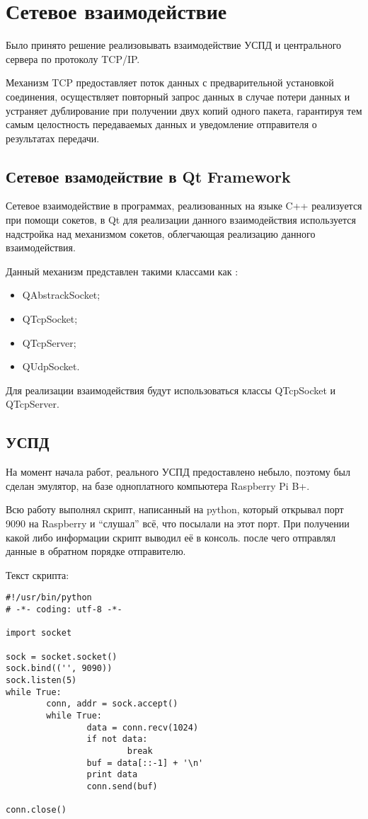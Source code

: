 \section{Сетевое взаимодействие}

Было принято решение реализовывать взаимодействие УСПД и центрального сервера по протоколу TCP/IP.

Механизм TCP предоставляет поток данных с предварительной установкой соединения, осуществляет повторный запрос данных в случае потери данных и устраняет дублирование при получении двух копий одного пакета, гарантируя тем самым целостность передаваемых данных и уведомление отправителя о результатах передачи.

\subsection{Сетевое взамодействие в Qt Framework}

Сетевое взаимодействие в программах, реализованных на языке C++ реализуется при помощи сокетов, в Qt для реализации данного взаимодействия используется надстройка над механизмом сокетов, облегчающая реализацию данного взаимодействия.

Данный механизм представлен такими классами как \cite{qt_net}:
\begin{itemize}
 \item QAbstrackSocket;
 \item QTcpSocket;
 \item QTcpServer;
 \item QUdpSocket.
\end{itemize}

Для реализации взаимодействия будут использоваться классы QTcpSocket и QTcpServer.

\subsection{УСПД}

На момент начала работ, реального УСПД предоставлено небыло, поэтому был сделан эмулятор, на базе одноплатного компьютера Raspberry Pi B+. 

Всю работу выполнял скрипт, написанный на python, который открывал порт 9090 на Raspberry и ``слушал'' всё, что посылали на этот порт. При получении какой либо информации скрипт выводил её в консоль. после чего отправлял данные в обратном порядке отправителю. 

Текст скрипта:

\begin{lstlisting}
#!/usr/bin/python
# -*- coding: utf-8 -*-

import socket

sock = socket.socket()
sock.bind(('', 9090))
sock.listen(5)
while True:
        conn, addr = sock.accept()
        while True:
                data = conn.recv(1024)
                if not data:
                        break
                buf = data[::-1] + '\n'
                print data
                conn.send(buf)

conn.close()
\end{lstlisting}

